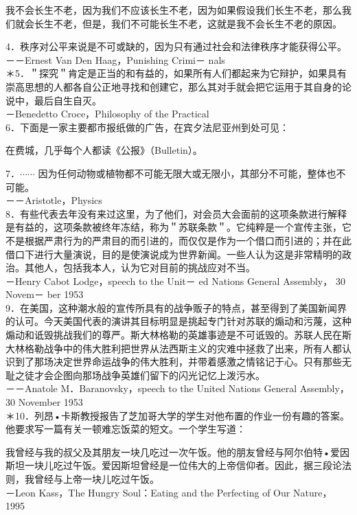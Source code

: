 我不会长生不老，因为我们不应该长生不老，因为如果假设我们长生不老，那么我们就会长生不老，但是，我们不可能长生不老，这就是我不会长生不老的原因。

4．秩序对公平来说是不可或缺的，因为只有通过社会和法律秩序才能获得公平。\\
－－Ernest Van Den Haag，Punishing Crimi－ nals\\
＊5．＂探究＂肯定是正当的和有益的，如果所有人们都起来为它辩护，如果具有崇高思想的人都各自公正地寻找和创建它，那么其对手就会把它运用于其自身的论说中，最后自生自灭。\\
－Benedetto Croce，Philosophy of the Practical\\
6．下面是一家主要都市报纸做的广告，在宾夕法尼亚州到处可见：

在费城，几乎每个人都读《公报》（Bulletin）。

7．$\cdots \cdots$ 因为任何动物或植物都不可能无限大或无限小，其部分不可能，整体也不可能。\\
－－Aristotle，Physics\\
8．有些代表去年没有来过这里，为了他们，对会员大会面前的这项条款进行解释是有益的，这项条款被终年冻结，称为＂苏联条款＂。它纯粹是一个宣传主张，它不是根据严肃行为的严肃目的而引进的，而仅仅是作为一个借口而引进的；并在此借口下进行大量演说，目的是使演说成为世界新闻。一些人认为这是非常精明的政治。其他人，包括我本人，认为它对目前的挑战应对不当。\\
－Henry Cabot Lodge，speech to the Unit－ ed Nations General Assembly， 30 Novem－ ber 1953\\
9．在美国，这种潮水般的宣传所具有的战争贩子的特点，甚至得到了美国新闻界的认可。今天美国代表的演讲其目标明显是挑起专门针对苏联的煽动和污蔑，这种煽动和诋毁挑战我们的尊严。斯大林格勒的英雄事迹是不可诋毁的。苏联人民在斯大林格勒战争中的伟大胜利把世界从法西斯主义的灾难中拯救了出来，所有人都认识到了那场决定世界命运战争的伟大胜利，并带着感激之情铭记于心。只有那些无耻之徒才会企图向那场战争英雄们留下的闪光记忆上泼污水。\\
－－Anatole M．Baranovsky，speech to the United Nations General Assembly， 30 November 1953\\
＊10．列昂•卡斯教授报告了芝加哥大学的学生对他布置的作业一份有趣的答案。他要求写一篇有关一顿难忘饭菜的短文。一个学生写道：

我曾经与我的叔父及其朋友一块几吃过一次午饭。他的朋友曾经与阿尔伯特•爱因斯坦一块儿吃过午饭。爱因斯坦曾经是一位伟大的上帝信仰者。因此，据三段论法则，我曾经与上帝一块儿吃过午饭。\\
－Leon Kass，The Hungry Soul：Eating and the Perfecting of Our Nature， 1995

